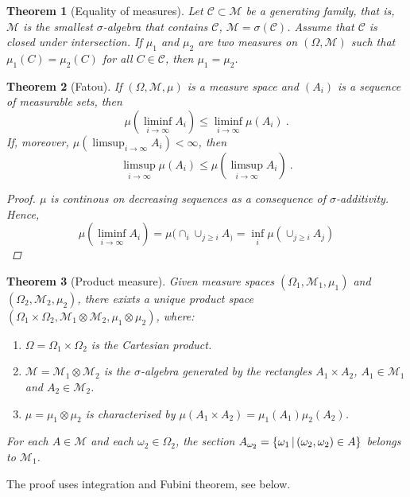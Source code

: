\documentclass[12pt,a4paper]{amsart}
\theoremstyle{plain}%
\newtheorem{theorem}{Theorem}%
\theoremstyle{definition}
\theoremstyle{remark}
\begin{document}
\begin{theorem}[Equality of measures] Let $\mathcal C \subset \mathcal M$ be a
  generating family, that is, $\mathcal M$ is the smallest
  $\sigma$-algebra that contains $\mathcal C$, $\mathcal M =
  \sigma(\mathcal C)$. Assume that $\mathcal C$ is closed under
  intersection. If $\mu_1$ and $\mu_2$ are two measures on
  $(\Omega,\mathcal M)$ such that $\mu_1(C) = \mu_2(C)$ for all $C \in
  \mathcal C$, then $\mu_1 = \mu_2$. 
\end{theorem}

\begin{theorem}[Fatou]
If $(\Omega,\mathcal M,\mu)$ is a measure space and $(A_i)$ is a
sequence of measurable sets, then
\begin{equation*}
  \mu(\liminf_{i\to\infty} A_i) \leq \liminf_{i\to\infty} \mu(A_i) \ .
\end{equation*}
If, moreover, $\mu(\limsup_{i\to\infty} A_i) < \infty$, then
\begin{equation*}
  \limsup_{i\to\infty} \mu(A_i) \leq \mu(\limsup_{i\to\infty} A_i) \ .
\end{equation*}
\begin{proof}
$\mu$ is continous on decreasing sequences as a consequence of
$\sigma$-additivity. Hence,
  \begin{equation*}
\mu(\liminf_{i\to\infty} A_i) = \mu(\cap_i \cup_{j\ge i} A_) = \inf_i
\mu(\cup_{j \geq i} A_j)    
  \end{equation*}
\end{proof}
\end{theorem}
\begin{theorem}[Product measure] Given measure spaces
  $(\Omega_1,\mathcal M_1,\mu_1)$ and $(\Omega_2,\mathcal M_2,\mu_2)$,
  there exixts a unique \emph{product space} $(\Omega_1 \times
  \Omega_2, \mathcal M_1 \otimes \mathcal M_2, \mu_1 \otimes \mu_2)$, where:
  \begin{enumerate}
  \item $\Omega = \Omega_1 \times \Omega _2$ is the Cartesian product.
  \item $\mathcal M = \mathcal M_1 \otimes \mathcal M_2$ is the
    $\sigma$-algebra generated by the rectangles $A_1 \times A_2$,
    $A_1 \in \mathcal M_1$ and $A_2 \in \mathcal M_2$. 
  \item $\mu = \mu_1 \otimes \mu_2$ is characterised by $\mu(A_1
    \times A_2) = \mu_1(A_1) \mu_2(A_2)$.
  \end{enumerate}
For each $A \in \mathcal M$ and each $\omega_2 \in \Omega_2$, the
section $A_{\omega_2} = \left\{\omega_1 \, \middle| \, (\omega_2,\omega_2) \in A \right\}$
belongs to $\mathcal M_1$.
\end{theorem}
The proof uses integration and Fubini theorem, see below.
\end{document}
